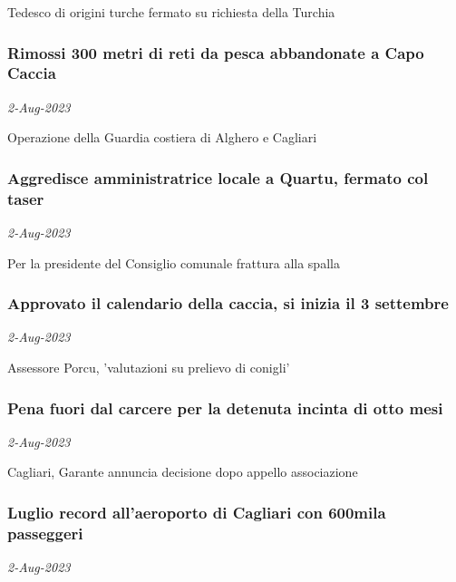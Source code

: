 Tedesco di origini turche fermato su richiesta della Turchia
\subsubsection{Rimossi 300 metri di reti da pesca abbandonate a Capo Caccia \href{https://www.ansa.it/sardegna/notizie/2023/08/02/rimossi-300-metri-di-reti-da-pesca-abbandonate-a-capo-caccia_5ed224b8-4077-467f-89d6-6f2a6537d8ac.html}{}}
\textit{2-Aug-2023}

Operazione della Guardia costiera di Alghero e Cagliari
\subsubsection{Aggredisce amministratrice locale a Quartu, fermato col taser \href{https://www.ansa.it/sardegna/notizie/2023/08/02/aggredisce-amministratrice-locale-a-quartu-fermato-col-taser_3686777e-6112-4dde-b1b6-80c0129be13e.html}{}}
\textit{2-Aug-2023}

Per la presidente del Consiglio comunale frattura alla spalla
\subsubsection{Approvato il calendario della caccia, si inizia il 3 settembre \href{https://www.ansa.it/sardegna/notizie/2023/08/02/approvato-il-calendario-della-caccia-si-inizia-il-3-settembre_5698f52a-b279-475c-bb30-3dce85abd4e8.html}{}}
\textit{2-Aug-2023}

Assessore Porcu, 'valutazioni su prelievo di conigli'
\subsubsection{Pena fuori dal carcere per la detenuta incinta di otto mesi \href{https://www.ansa.it/sardegna/notizie/2023/08/02/pena-fuori-dal-carcere-per-la-detenuta-incinta-di-otto-mesi_d8cfce55-7551-4aa0-9171-fbc3ebc35993.html}{}}
\textit{2-Aug-2023}

Cagliari, Garante annuncia decisione dopo appello associazione
\subsubsection{Luglio record all'aeroporto di Cagliari con 600mila passeggeri \href{https://www.ansa.it/sardegna/notizie/2023/08/02/luglio-record-allaeroporto-di-cagliari-con-600mila-passeggeri_18e7d2d4-d85e-4340-9aef-c5f9e6314e8f.html}{}}
\textit{2-Aug-2023}

